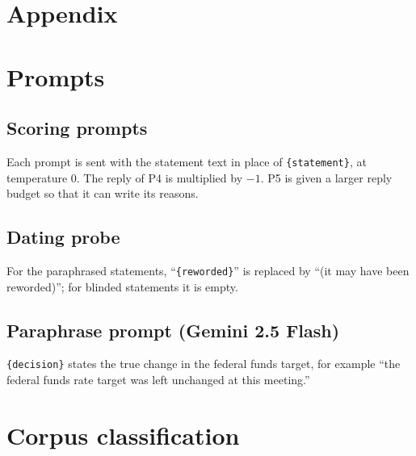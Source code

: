 \clearpage
\appendix
\renewcommand{\thetable}{A\arabic{table}}
\setcounter{table}{0}
\section*{Appendix}

\section{Prompts}\label{app:prompts}

\subsection{Scoring prompts}
Each prompt is sent with the statement text in place of \texttt{\{statement\}}, at temperature 0. The
reply of P4 is multiplied by $-1$. P5 is given a larger reply budget so that it can write its reasons.



\subsection{Dating probe}
For the paraphrased statements, ``\texttt{\{reworded\}}'' is replaced by ``(it may have been reworded)'';
for blinded statements it is empty.



\subsection{Paraphrase prompt (Gemini 2.5 Flash)}
\texttt{\{decision\}} states the true change in the federal funds target, for example ``the federal funds
rate target was left unchanged at this meeting.''



\section{Corpus classification}\label{app:corpus}

\begin{table}[H]
\centering
\caption{Statements that are not scheduled post-meeting statements}\label{tab:corpus}
\small

\end{table}

